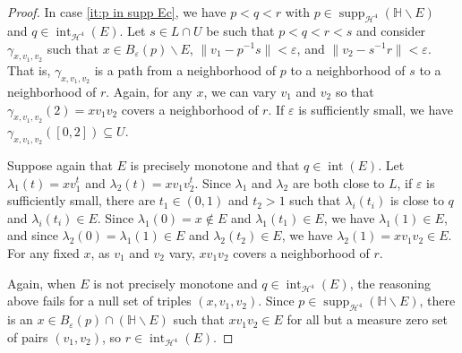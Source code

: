\documentclass[11pt,reqno]{amsart}
\renewcommand{\H}{\mathbb{H}}
\newcommand{\cH}{\mathcal{H}}
\renewcommand{\epsilon}{\varepsilon}
\newcommand{\0}{\mathbf{0}}
\renewcommand{\1}{\mathbf 1}
\renewcommand{\subset}{\subseteq}
\renewcommand{\setminus}{\smallsetminus}
\theoremstyle{remark}
\DeclareMathOperator{\inter}{int}
\DeclareMathOperator{\supp}{supp}
\begin{document}
\begin{proof}
  In case \eqref{it:p in supp Ec}, we have $p<q<r$ with $p\in \supp_{\cH^4}(\H\setminus E)$ and $q\in \inter_{\cH^4}(E)$.
  Let $s\in L\cap U$ be such that $p<q<r<s$ and consider $\gamma_{x,v_1,v_2}$ such that
  $x\in B_\epsilon(p)\setminus E$, $\|v_1- p^{-1}s\|<\epsilon$, and $\|v_2- s^{-1} r\|<\epsilon$. That is, $\gamma_{x,v_1,v_2}$ is a path from a neighborhood of $p$ to a neighborhood of $s$ to a neighborhood of $r$. Again, for any $x$, we can vary $v_1$ and $v_2$ so that $\gamma_{x,v_1,v_2}(2)=xv_1v_2$ covers a neighborhood of $r$. If $\epsilon$ is sufficiently small, we have $\gamma_{x,v_1,v_2}([0,2])\subset U$.

  Suppose again that $E$ is precisely monotone and that $q\in \inter(E)$. Let $\lambda_1(t)=xv_1^t$ and $\lambda_2(t)=xv_1v_2^t$. Since $\lambda_1$ and $\lambda_2$ are both close to $L$, if $\epsilon$ is sufficiently small, there are $t_1\in (0,1)$ and $t_2>1$ such that $\lambda_i(t_i)$ is close to $q$ and $\lambda_i(t_i)\in E$. Since $\lambda_1(0)=x\not\in E$ and $\lambda_1(t_1)\in E$, we have $\lambda_1(1)\in E$, and since $\lambda_2(0)=\lambda_1(1)\in E$ and $\lambda_2(t_2)\in E$, we have $\lambda_2(1)=xv_1v_2\in E$. For any fixed $x$, as $v_1$ and $v_2$ vary, $xv_1v_2$ covers a neighborhood of $r$.

  Again, when $E$ is not precisely monotone and $q\in \inter_{\cH^4}(E)$, the reasoning above fails for a null set of triples $(x, v_1, v_2)$. Since $p\in \supp_{\cH^4} (\H\setminus E)$, there is an $x\in B_\epsilon(p)\cap (\H\setminus E)$ such that $xv_1v_2\in E$ for all but a measure zero set of pairs $(v_1,v_2)$, so $r\in \inter_{\cH^4}(E)$.
\end{proof}
\end{document}
